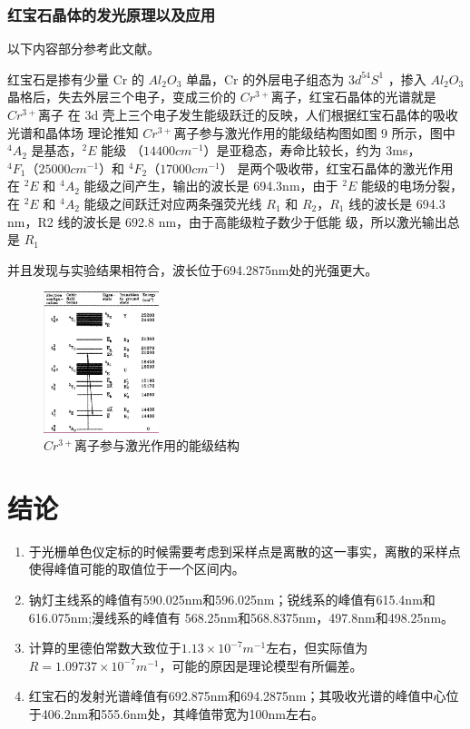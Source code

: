 \documentclass[a4paper,UTF8]{ctexart}
\begin{document}
\subsubsection{红宝石晶体的发光原理以及应用}

以下内容部分参考此文献\cite{a}\cite{this}。

红宝石是掺有少量 Cr 的 $Al_2O_3$ 单晶，Cr 的外层电子组态为 $3d^54S^1$
，掺入 $Al_2O_3$
晶格后，失去外层三个电子，变成三价的 $Cr^{3+}$离子，红宝石晶体的光谱就是 $Cr^{3+}$离子
在 3d 壳上三个电子发生能级跃迁的反映，人们根据红宝石晶体的吸收光谱和晶体场
理论推知 $Cr^{3+}$离子参与激光作用的能级结构图如图 9 所示，图中 $^4A_2$ 是基态，$^2E$ 能级
（$14400 cm^{-1}$）是亚稳态，寿命比较长，约为 3ms，$^4F_1（25000 cm^{-1}）$和 $^4F_2（17000 cm^{-1}）$
是两个吸收带，红宝石晶体的激光作用在 $^2E$ 和 $^4A_2$ 能级之间产生，输出的波长是
694.3nm，由于 $^2E$ 能级的电场分裂，在 $^2E$ 和 $^4A_2$ 能级之间跃迁对应两条强荧光线 $R_1$ 和
$R_2$，$R_1$ 线的波长是 694.3 nm，R2 线的波长是 692.8 nm，由于高能级粒子数少于低能
级，所以激光输出总是 $R_1$ 

并且发现与实验结果相符合，波长位于694.2875nm处的光强更大。

\begin{figure}[H]
    \centering
    \begin{minipage}[b]{0.9\textwidth}
        \centering
        \includegraphics[width=0.3\textwidth]{./fig.png}
        \caption{$Cr^{3+}$离子参与激光作用的能级结构}
    \end{minipage}
\end{figure}


\section{结论}

\begin{enumerate}
    \item 于光栅单色仪定标的时候需要考虑到采样点是离散的这一事实，离散的采样点使得峰值可能的取值位于一个区间内。
    \item 钠灯主线系的峰值有590.025nm和596.025nm；锐线系的峰值有615.4nm和616.075nm;漫线系的峰值有
    568.25nm和568.8375nm，497.8nm和498.25nm。
    \item 计算的里德伯常数大致位于$1.13 \times 10^{-7} m^{-1}$左右，但实际值为$R = 1.09737 \times 10^{-7} m^{-1}$，可能的原因是理论模型有所偏差。
    \item 红宝石的发射光谱峰值有692.875nm和694.2875nm；其吸收光谱的峰值中心位于406.2nm和555.6nm处，其峰值带宽为100nm左右。
\end{enumerate}
\end{document}
